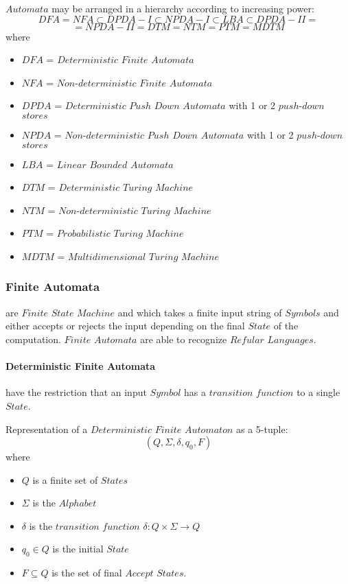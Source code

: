 \documentclass{article}
\begin{document}
    $Automata$ may be arranged in a hierarchy according to increasing power:
    \[
        DFA = NFA \subset DPDA-I \subset NPDA-I \subset LBA \subset DPDA-II =
    \]\[
        = NPDA-II = DTM = NTM = PTM = MDTM
    \]
    where
    \begin{itemize}
    \item $DFA$ = $Deterministic$ $Finite$ $Automata$
    \item $NFA$ = $Non$-$deterministic$ $Finite$ $Automata$
    \item $DPDA$ = $Deterministic$ $Push$ $Down$ $Automata$ with 1
      or 2 $push$-$down$ $stores$
    \item $NPDA$ = $Non$-$deterministic$ $Push$ $Down$ $Automata$
      with 1 or 2 $push$-$down$ $stores$
    \item $LBA$ = $Linear$ $Bounded$ $Automata$
    \item $DTM$ = $Deterministic$ $Turing$ $Machine$
    \item $NTM$ = $Non$-$deterministic$ $Turing$ $Machine$
    \item $PTM$ = $Probabilistic$ $Turing$ $Machine$
    \item $MDTM$ = $Multidimensional$ $Turing$ $Machine$
    \end{itemize}

    \subsubsection{Finite Automata} are $Finite$ $State$
    $Machine$ and which takes a finite input string of $Symbols$ and
    either accepts or rejects the input depending on the final $State$
    of the computation. $Finite$ $Automata$ are able to recognize
    $Refular$ $Languages$.

    \paragraph{Deterministic Finite Automata} have the restriction
    that an input $Symbol$ has a $transition$ $function$ to a single
    $State$.

    Representation of a $Deterministic$ $Finite$ $Automaton$ as a 5-tuple:
    \[
        (Q,\Sigma,\delta,q_0,F)
    \]
    where
    \begin{itemize}
    \item $Q$ is a finite set of $States$
    \item $\Sigma$ is the $Alphabet$
    \item $\delta$ is the $transition$ $function$ $\delta: Q \times
      \Sigma \rightarrow Q$
    \item $q_0 \in Q$ is the initial $State$
    \item $F \subseteq Q$ is the set of final $Accept$ $States$.
    \end{itemize}
\end{document}

